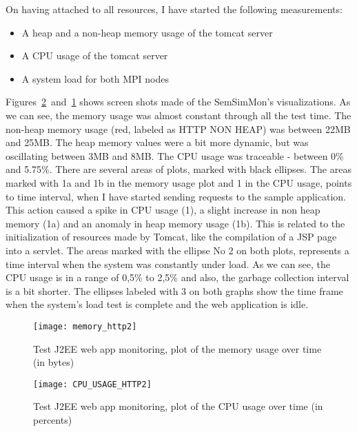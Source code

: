 On having attached to all resources, I have started the following measurements:

\begin{itemize}
\item A heap and a non-heap memory usage of the tomcat server
\item A CPU usage of the tomcat server
\item A system load for both MPI nodes
\end{itemize}

Figures~\ref{fig:http_cpu}~and~\ref{fig:http_memory} shows screen shots made of the SemSimMon\rq{}s visualizations. As we can see, the memory usage was almost constant through all the test time. The non-heap memory usage (red, labeled as HTTP NON HEAP) was between 22MB and 25MB. The heap memory values were a bit more dynamic, but was oscillating between 3MB and 8MB. The CPU usage was traceable - between 0\% and 5.75\%. There are several areas of plots, marked with black ellipses. The areas marked with 1a and 1b in the memory usage plot and 1 in the CPU usage, points to time interval, when I have started sending requests to the sample application. This action caused a spike in CPU usage (1), a slight increase in non heap memory (1a) and an anomaly in heap memory usage (1b). This is related to the initialization of resources made by Tomcat, like the compilation of a JSP page into a servlet. The areas marked with the ellipse No 2 on both plots, represents a time interval when the system was constantly under load. As we can see, the CPU usage is in a range of 0,5\% to 2,5\% and also, the garbage collection interval is a bit shorter. The ellipses labeled with 3 on both graphs show the time frame when the system\rq{}s load test is complete and the web application is idle.

\begin{figure}[ht]
\centering
\texttt{[image: memory\_http2]}
\caption{Test J2EE web app monitoring, plot of the memory usage over time (in bytes)}
\label{fig:http_memory}
\end{figure}

\begin{figure}[ht]
\centering
\texttt{[image: CPU\_USAGE\_HTTP2]}
\caption{Test J2EE web app monitoring, plot of the CPU usage over time (in percents)}
\label{fig:http_cpu}
\end{figure}


